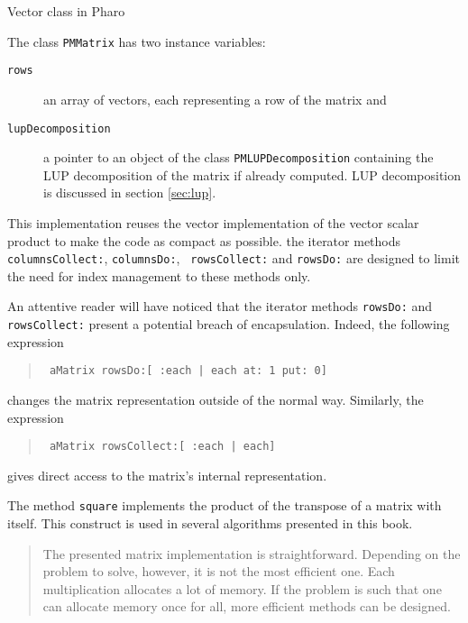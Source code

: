 \documentclass[twoside]{book}
\begin{document}
\begin{listing} Vector class in Pharo \label{ls:vector}

\end{listing}

\noindent The class {\tt PMMatrix} has two instance variables:
\begin{description}
\item[\tt rows] an array of vectors, each representing a
row of the matrix and
\item[\tt lupDecomposition ] a pointer to an object of the class
{\tt PMLUPDecomposition} containing the LUP decomposition of the
matrix if already computed. LUP decomposition is discussed in
section \ref{sec:lup}.
\end{description}
This implementation reuses the vector implementation of the vector
scalar product to make the code as compact as possible. the
iterator methods {\tt columnsCollect:}, {\tt columnsDo:}, {\tt
rowsCollect:} and {\tt rowsDo:} are designed to limit the need for
index management to these methods only.

An attentive reader will have noticed that the iterator methods
{\tt rowsDo:} and {\tt rowsCollect:} present a potential breach of
encapsulation. Indeed, the following expression
\begin{quote}
\begin{verbatim}
 aMatrix rowsDo:[ :each | each at: 1 put: 0]
\end{verbatim}
\end{quote}
changes the matrix representation outside of the normal way.
Similarly, the expression
\begin{quote}
\begin{verbatim}
 aMatrix rowsCollect:[ :each | each]
\end{verbatim}
\end{quote}
gives direct access to the matrix's internal representation.

The method {\tt square} implements the product of the transpose of
a matrix with itself. This construct is used in several algorithms
presented in this book.

\begin{quotation}
 The presented matrix implementation is
straightforward. Depending on the problem to solve, however, it is
not the most efficient one. Each multiplication allocates a lot of
memory. If the problem is such that one can allocate memory once
for all, more efficient methods can be designed.
\end{quotation}
\end{document}
